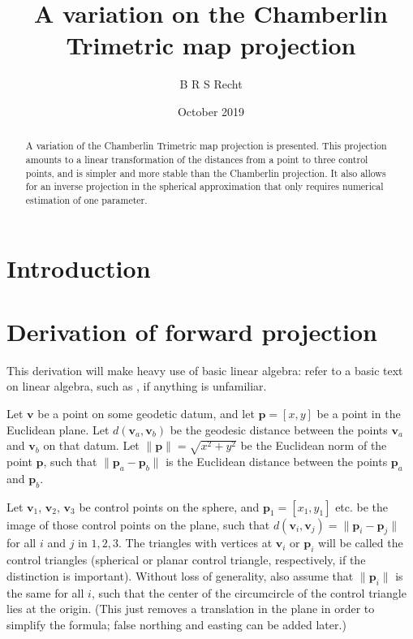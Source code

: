 \documentclass{amsart}[12pt]
\title{A variation on the Chamberlin Trimetric map projection}
\author{B R S Recht}
\date{October 2019}
\begin{document}
\begin{abstract}
   A variation of the Chamberlin Trimetric map projection is presented. This
   projection amounts to a linear transformation of the distances from a point
   to three control points, and is simpler and more stable than the Chamberlin
   projection. It also allows for an inverse projection in the spherical
   approximation that only requires numerical estimation of one parameter.
\end{abstract}
\maketitle

\section{Introduction}

\cite{christensen}\cite{snyder87}\cite{snyder89}

\section{Derivation of forward projection}
This derivation will make heavy use of basic linear algebra: refer to a basic
text on linear algebra, such as \cite{strang}, if anything is
unfamiliar.

Let $\mathbf v$ be a point on some geodetic datum, and let $\mathbf p = [x, y]$
be a point in the Euclidean plane. Let $d(\mathbf v_a, \mathbf v_b)$ be the
geodesic distance between the points $\mathbf v_a$ and $\mathbf v_b$ on that
datum. Let $\|\mathbf p\| = \sqrt{x^2 + y^2}$ be the Euclidean norm of the point
$\mathbf p$, such that $\|\mathbf p_a - \mathbf p_b\|$
is the Euclidean distance between the points $\mathbf p_a$ and $\mathbf p_b$.

Let $\mathbf v_1$, $\mathbf v_2$, $\mathbf v_3$ be control points on the sphere,
and $\mathbf p_1 = [x_1, y_1]$ etc. be the image of those control points on the
plane, such that $d(\mathbf v_i, \mathbf v_j) = \|\mathbf p_i - \mathbf p_j\|$
for all $i$ and $j$ in ${1, 2, 3}$. The triangles with vertices at $\mathbf v_i$
or $\mathbf p_i$ will be called the control triangles (spherical or planar
control triangle, respectively, if the distinction is important). Without loss
of generality, also assume that $\|\mathbf p_i\|$ is the same for all $i$, such
that the center of the circumcircle of the control triangle lies at the origin.
(This just removes a translation in the plane in order to simplify the formula;
false northing and easting can be added later.)
\end{document}

